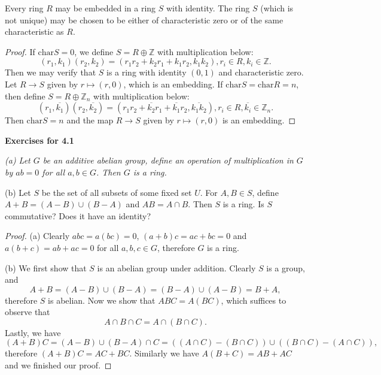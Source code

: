 \begin{theorem}
Every ring $R$ may be embedded in a ring $S$ with identity. The ring $S$ (which is not unique) may be chosen to be either of characteristic zero or of the same characteristic as $R$.
\end{theorem}
\begin{proof}
If $\mathrm{char}S=0$, we define $S=R\oplus\mathbb{Z}$ with multiplication below:
$$
\left( r_1,k_1 \right) \left( r_2,k_2 \right) =\left( r_1r_2+k_2r_1+k_1r_2,k_1k_2 \right) ,r_i\in R,k_i\in \mathbb{Z} .
$$
Then we may verify that $S$ is a ring with identity $(0,1)$ and characteristic zero. Let $R\to S$ given by $r\mapsto(r,0)$, which is an embedding. If $\mathrm{char}S=\mathrm{char}R=n$, then define $S=R\oplus\mathbb{Z}_n$ with multiplication below:
$$
\left( r_1,\overline{k_1} \right) \left( r_2,\overline{k_2} \right) =\left( r_1r_2+\overline{k_2}r_1+\overline{k_1}r_2,\overline{k_1k_2} \right) ,r_i\in R,\overline{k_i}\in \mathbb{Z} _n.
$$
Then $\mathrm{char}S=n$ and the map $R\to S$ given by $r\mapsto(r,0)$ is an embedding.
\end{proof}
\begin{center}
\begin{large}
    \textbf{Exercises for 4.1}
\end{large}
\end{center}
\begin{problem}\em
(a) Let $G$ be an additive abelian group, define an operation of multiplication in $G$ by $ab=0$ for all $a,b\in G$. Then $G$ is a ring.\par
(b) Let $S$ be the set of all subsets of some fixed set $U$. For $A,B\in S$, define $A+B=(A-B)\cup(B-A)$ and $AB=A\cap B$. Then $S$ is a ring. Is $S$ commutative? Does it have an identity?
\end{problem}
\begin{proof}
(a) Clearly $abc=a(bc)=0$, $(a+b)c=ac+bc=0$ and $a(b+c)=ab+ac=0$ for all $a,b,c\in G$, therefore $G$ is a ring.\par
(b) We first show that $S$ is an abelian group under addition. Clearly $S$ is a group, and 
$$
A+B=\left( A-B \right) \cup \left( B-A \right) =\left( B-A \right) \cup \left( A-B \right) =B+A,
$$
therefore $S$ is abelian. Now we show that $ABC=A(BC)$, which suffices to observe that 
$$
A\cap B\cap C=A\cap \left( B\cap C \right) .
$$
Lastly, we have 
$$
\left( A+B \right) C=\left( A-B \right) \cup \left( B-A \right) \cap C=\left( \left( A\cap C \right) -\left( B\cap C \right) \right) \cup \left( \left( B\cap C \right) -\left( A\cap C \right) \right) ,
$$
therefore $(A+B)C=AC+BC$. Similarly we have $A(B+C)=AB+AC$ and we finished our proof.
\end{proof}
